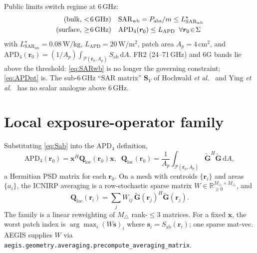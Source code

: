 \documentclass[journal]{IEEEtran}
\newcommand{\rr}{\bm{r}}
\newcommand{\xx}{\bm{x}}
\newcommand{\Gtil}{\widetilde{\mathbf{G}}}
\newcommand{\Sab}{S_{\mathrm{ab}}}
\newcommand{\SARwb}{\mathrm{SAR}_{\mathrm{wb}}}
\newcommand{\APD}{\mathrm{APD}}
\newcommand{\Pabs}{P_{\mathrm{abs}}}
\newcommand{\Q}{\mathbf{Q}}
\newcommand{\Qloc}{\Q_{\mathrm{loc}}}
\begin{document}
Public limits switch regime at $6$\,GHz:
\begin{align}
  \text{(bulk, \(<\!6\)\,GHz)}\quad&\SARwb=\Pabs/m\le L_{\SARwb}^\star
  \label{eq:SARwb}\\
  \text{(surface, \(\ge\!6\)\,GHz)}\quad&\APD_4(\rr_0)\le L_{\APD}\;\;\forall\rr_0\!\in\!\Sigma
  \label{eq:APDpt}
\end{align}
with $L_{\SARwb}^\star=0.08\,\mathrm{W/kg}$, $L_{\APD}=20\,\mathrm{W/m^2}$,
patch area $A_p=4\,\mathrm{cm}^2$, and
$\APD_4(\rr_0)=(1/A_p)\int_{\mathcal{P}(\rr_0,A_p)}\Sab\,\mathrm{d}A$.
FR2 (24--71\,GHz) and 6G bands lie above the threshold:
\eqref{eq:SARwb} is no longer the governing constraint; \eqref{eq:APDpt}
is. The sub-6\,GHz ``SAR matrix'' $\mathbf S_V$ of
Hochwald \emph{et al.}~\cite{Hochwald2014} and Ying \emph{et
al.}~\cite{Ying2015} has no scalar analogue above 6\,GHz.

\section{Local exposure-operator family}\label{sec:local-Q}

Substituting \eqref{eq:Sab} into the $\APD_4$ definition,
\begin{equation}\label{eq:Qloc}
  \APD_4(\rr_0)=\xx^H\Qloc(\rr_0)\xx,\;\;
  \Qloc(\rr_0)=\frac{1}{A_p}\!\!\int_{\mathcal P(\rr_0,A_p)}\!\!\!\!\Gtil^H\Gtil\,\mathrm dA,
\end{equation}
a Hermitian PSD matrix for each $\rr_0$. On a mesh with centroids
$\{\rr_i\}$ and areas $\{a_i\}$, the ICNIRP averaging is a
row-stochastic sparse matrix
$W\!\in\!\mathbb{R}^{M_\triangle\times M_\triangle}_{\ge 0}$, and
\begin{equation}\label{eq:QlocD}
  \Qloc(\rr_i)=\sum_{j}W_{ij}\,\Gtil(\rr_j)^H\Gtil(\rr_j).
\end{equation}
The family is a linear reweighting of $M_\triangle$ rank-$\le 3$
matrices. For a fixed $\xx$, the worst patch index is
$\arg\max_i(W\bm s)_i$ where $\bm s_i\!=\!\Sab(\rr_i)$; one sparse
mat-vec. AEGIS supplies $W$ via
\texttt{aegis.geometry.averaging.\allowbreak precompute\_averaging\_matrix}.
\end{document}

